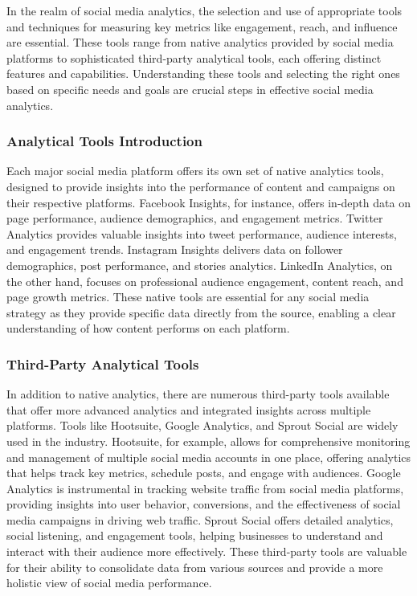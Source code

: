 \documentclass[
]{book}
\begin{document}
In the realm of social media analytics, the selection and use of appropriate tools and techniques for measuring key metrics like engagement, reach, and influence are essential. These tools range from native analytics provided by social media platforms to sophisticated third-party analytical tools, each offering distinct features and capabilities. Understanding these tools and selecting the right ones based on specific needs and goals are crucial steps in effective social media analytics.

\hypertarget{analytical-tools-introduction}{%
\subsubsection*{Analytical Tools Introduction}\label{analytical-tools-introduction}}

Each major social media platform offers its own set of native analytics tools, designed to provide insights into the performance of content and campaigns on their respective platforms. Facebook Insights, for instance, offers in-depth data on page performance, audience demographics, and engagement metrics. Twitter Analytics provides valuable insights into tweet performance, audience interests, and engagement trends. Instagram Insights delivers data on follower demographics, post performance, and stories analytics. LinkedIn Analytics, on the other hand, focuses on professional audience engagement, content reach, and page growth metrics. These native tools are essential for any social media strategy as they provide specific data directly from the source, enabling a clear understanding of how content performs on each platform.

\hypertarget{third-party-analytical-tools}{%
\subsubsection*{Third-Party Analytical Tools}\label{third-party-analytical-tools}}

In addition to native analytics, there are numerous third-party tools available that offer more advanced analytics and integrated insights across multiple platforms. Tools like Hootsuite, Google Analytics, and Sprout Social are widely used in the industry. Hootsuite, for example, allows for comprehensive monitoring and management of multiple social media accounts in one place, offering analytics that helps track key metrics, schedule posts, and engage with audiences. Google Analytics is instrumental in tracking website traffic from social media platforms, providing insights into user behavior, conversions, and the effectiveness of social media campaigns in driving web traffic. Sprout Social offers detailed analytics, social listening, and engagement tools, helping businesses to understand and interact with their audience more effectively. These third-party tools are valuable for their ability to consolidate data from various sources and provide a more holistic view of social media performance.
\end{document}
